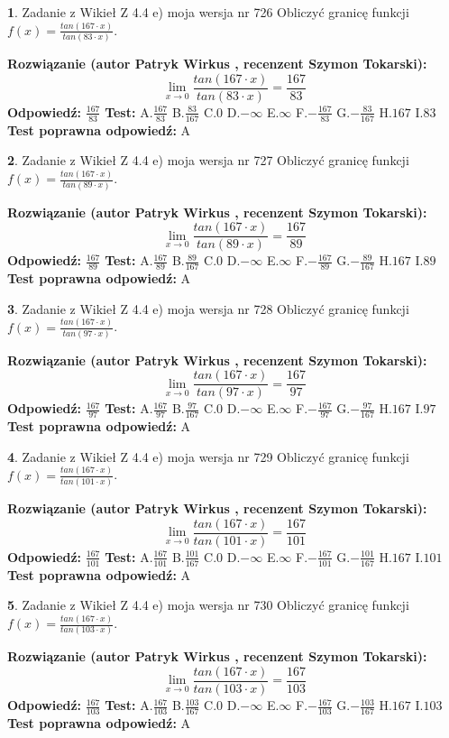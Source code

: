 \documentclass[12pt, a4paper]{article}
\theoremstyle{definition} %
\newtheorem{zad}{}
\newcommand{\zadStart}[1]{\begin{zad}#1\newline}
\newcommand{\zadStop}{\end{zad}}
\newcommand{\rozwStart}[2]{\noindent \textbf{Rozwiązanie (autor #1 , recenzent #2): }\newline}
\newcommand{\rozwStop}{\newline}
\newcommand{\odpStart}{\noindent \textbf{Odpowiedź:}\newline}
\newcommand{\odpStop}{\newline}
\newcommand{\testStart}{\noindent \textbf{Test:}\newline}
\newcommand{\testStop}{\newline}
\newcommand{\kluczStart}{\noindent \textbf{Test poprawna odpowiedź:}\newline}
\newcommand{\kluczStop}{\newline}
\begin{document}
\zadStart{Zadanie z Wikieł Z 4.4 e) moja wersja nr 726}
Obliczyć granicę funkcji $f(x)=\frac{tan(167\cdot x)}{tan(83\cdot x)}$.
\zadStop
\rozwStart{Patryk Wirkus}{Szymon Tokarski}
$$\lim\limits_{x\to 0}\frac{tan(167\cdot x)}{tan(83\cdot x)}=
\frac{167}{83}$$
\rozwStop
\odpStart
$\frac{167}{83}$
\odpStop
\testStart
A.$\frac{167}{83}$
B.$\frac{83}{167}$
C.$0$
D.$-\infty$
E.$\infty$
F.$-\frac{167}{83}$
G.$-\frac{83}{167}$
H.$167$
I.$83$
\testStop
\kluczStart
A
\kluczStop



\zadStart{Zadanie z Wikieł Z 4.4 e) moja wersja nr 727}
Obliczyć granicę funkcji $f(x)=\frac{tan(167\cdot x)}{tan(89\cdot x)}$.
\zadStop
\rozwStart{Patryk Wirkus}{Szymon Tokarski}
$$\lim\limits_{x\to 0}\frac{tan(167\cdot x)}{tan(89\cdot x)}=
\frac{167}{89}$$
\rozwStop
\odpStart
$\frac{167}{89}$
\odpStop
\testStart
A.$\frac{167}{89}$
B.$\frac{89}{167}$
C.$0$
D.$-\infty$
E.$\infty$
F.$-\frac{167}{89}$
G.$-\frac{89}{167}$
H.$167$
I.$89$
\testStop
\kluczStart
A
\kluczStop



\zadStart{Zadanie z Wikieł Z 4.4 e) moja wersja nr 728}
Obliczyć granicę funkcji $f(x)=\frac{tan(167\cdot x)}{tan(97\cdot x)}$.
\zadStop
\rozwStart{Patryk Wirkus}{Szymon Tokarski}
$$\lim\limits_{x\to 0}\frac{tan(167\cdot x)}{tan(97\cdot x)}=
\frac{167}{97}$$
\rozwStop
\odpStart
$\frac{167}{97}$
\odpStop
\testStart
A.$\frac{167}{97}$
B.$\frac{97}{167}$
C.$0$
D.$-\infty$
E.$\infty$
F.$-\frac{167}{97}$
G.$-\frac{97}{167}$
H.$167$
I.$97$
\testStop
\kluczStart
A
\kluczStop



\zadStart{Zadanie z Wikieł Z 4.4 e) moja wersja nr 729}
Obliczyć granicę funkcji $f(x)=\frac{tan(167\cdot x)}{tan(101\cdot x)}$.
\zadStop
\rozwStart{Patryk Wirkus}{Szymon Tokarski}
$$\lim\limits_{x\to 0}\frac{tan(167\cdot x)}{tan(101\cdot x)}=
\frac{167}{101}$$
\rozwStop
\odpStart
$\frac{167}{101}$
\odpStop
\testStart
A.$\frac{167}{101}$
B.$\frac{101}{167}$
C.$0$
D.$-\infty$
E.$\infty$
F.$-\frac{167}{101}$
G.$-\frac{101}{167}$
H.$167$
I.$101$
\testStop
\kluczStart
A
\kluczStop



\zadStart{Zadanie z Wikieł Z 4.4 e) moja wersja nr 730}
Obliczyć granicę funkcji $f(x)=\frac{tan(167\cdot x)}{tan(103\cdot x)}$.
\zadStop
\rozwStart{Patryk Wirkus}{Szymon Tokarski}
$$\lim\limits_{x\to 0}\frac{tan(167\cdot x)}{tan(103\cdot x)}=
\frac{167}{103}$$
\rozwStop
\odpStart
$\frac{167}{103}$
\odpStop
\testStart
A.$\frac{167}{103}$
B.$\frac{103}{167}$
C.$0$
D.$-\infty$
E.$\infty$
F.$-\frac{167}{103}$
G.$-\frac{103}{167}$
H.$167$
I.$103$
\testStop
\kluczStart
A
\kluczStop
\end{document}
